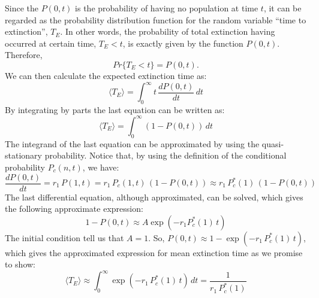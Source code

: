 Since the $P(0,t)$ is the probability of having no population at time $t$, it can be regarded as the probability distribution function for the random variable ``time to extinction'', $T_E$. In other words, the probability of total extinction having occurred at certain time, $T_E < t$, is exactly given by the function $P(0,t)$. Therefore, 
\begin{equation}
Pr\{T_E < t\} = P(0,t).
\end{equation}  
We can then calculate the expected extinction time as:
\begin{equation}
\langle T_E \rangle = \int_0^{\infty}t\,\frac{dP(0,t)}{dt}\,dt
\end{equation}
By integrating by parts the last equation can be written as:
\begin{equation}
\langle T_E \rangle = \int_0^{\infty}\left(1-P(0,t)\right)\,dt
\end{equation}
The integrand of the last equation can be approximated by using the quasi-stationary probability. Notice that, by using the definition of the conditional  probability $P_c(n,t)$, we have:
\begin{equation}
\frac{dP(0,t)}{dt}=r_1\,P(1,t)=r_1\,P_c(1,t)\,(1-P(0,t))\approx r_1\,P_c^{*}(1)\,(1-P(0,t))
\end{equation}
The last differential equation, although approximated, can be solved, which gives the following approximate expression:
\begin{equation}
1-P(0,t) \approx A\exp(-r_1P_c^{*}(1)\,t)
\end{equation}  
The initial condition tell us that $A=1$. So, $P(0,t) \approx 1 -\exp(-r_1\,P_c^{*}(1)\,t)$, which gives the approximated expression for mean extinction time as we promise to show: 
\begin{equation}
\langle T_E \rangle \approx \int_0^{\infty}\exp(-r_1\,P_c^{*}(1)\,t)\,dt=\frac{1}{r_1\,P_c^{*}(1)}
\end{equation}

